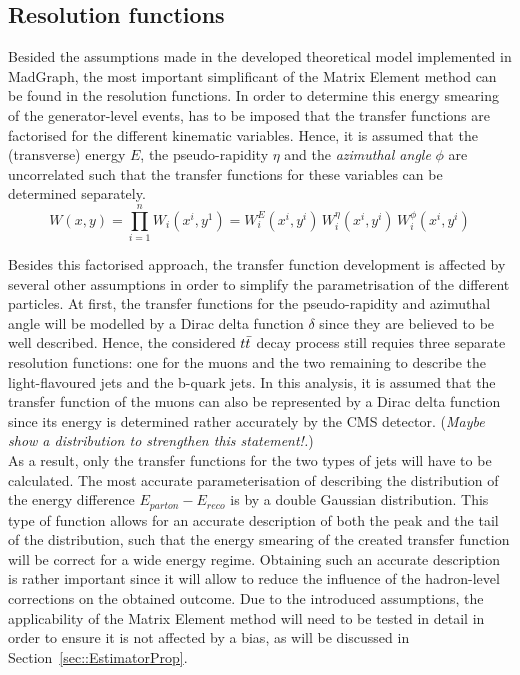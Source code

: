 \subsection{Resolution functions} \label{subsec::TF}

Besided the assumptions made in the developed theoretical model implemented in MadGraph, the most important simplificant of the Matrix Element method can be found in the resolution functions.
In order to determine this energy smearing of the generator-level events, has to be imposed that the transfer functions are factorised for the different kinematic variables.
Hence, it is assumed that the (transverse) energy $E$, the pseudo-rapidity $\eta$ and the \textit{azimuthal angle} $\phi$ are uncorrelated such that the transfer functions for these variables can be determined separately.
\\
\begin{equation}
 W(x,y) = \prod_{i=1}^{n} W_{i}(x^{i},y^{1}) = W_{i}^{E}(x^{i},y^i) \, W_{i}^{\eta}(x^i, y^i) \, W_{i}^{\phi}(x^i,y^i)
\end{equation}

Besides this factorised approach, the transfer function development is affected by several other assumptions in order to simplify the parametrisation of the different particles.
At first, the transfer functions for the pseudo-rapidity and azimuthal angle will be modelled by a Dirac delta function $\delta$ since they are believed to be well described.
Hence, the considered $t\bar{t}$ decay process still requies three separate resolution functions: one for the muons and the two remaining to describe the light-flavoured jets and the b-quark jets.
In this analysis, it is assumed that the transfer function of the muons can also be represented by a Dirac delta function since its energy is determined rather accurately by the CMS detector. (\textit{Maybe show a distribution to strengthen this statement!.})
\\
As a result, only the transfer functions for the two types of jets will have to be calculated. 
The most accurate parameterisation of describing the distribution of the energy difference $E_{parton} - E_{reco}$ is by a double Gaussian distribution.
This type of function allows for an accurate description of both the peak and the tail of the distribution, such that the energy smearing of the created transfer function will be correct for a wide energy regime.
Obtaining such an accurate description is rather important since it will allow to reduce the influence of the hadron-level corrections on the obtained outcome. Due to the introduced assumptions, the applicability of the Matrix Element method will need to be tested in detail in order to ensure it is not affected by a bias, as will be discussed in Section~\ref{sec::EstimatorProp}.


